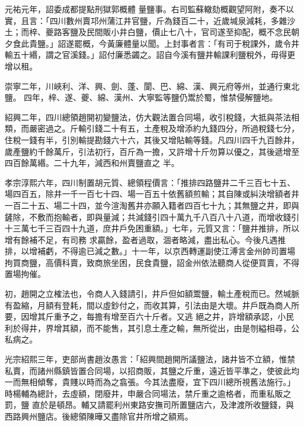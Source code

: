 \begin{pinyinscope}
 元祐元年，詔委成都提點刑獄郭概體
 量鹽事。右司監蘇轍劾概觀望阿附，奏不以實，且言：「四川數州賣邛州蒲江井官鹽，斤為錢百二十，近歲堿泉減耗，多雜沙土；而梓、夔路客鹽及民間販小井白鹽，價止七八十，官司遂至抑配，概不念民朝夕食此貴鹽。」詔遂罷概，今黃廉體量以聞。上封事者言：「有司于稅課外，歲令井輸五十緡，謂之官溪錢。」詔付廉悉蠲之。詔自今溪有鹽井輸課利鹽稅外，毋得更增以租。



 崇寧二年，川峽利、洋、興、劍、蓬、閬、巴、綿、漢、興元府等州，並通行東北鹽。
 四年，梓、遂、夔、綿、漢州、大寧監等鹽仍鬻於蜀，惟禁侵解鹽地。



 紹興二年，四川總領趙開初變鹽法，仿大觀法置合同場，收引稅錢，大抵與茶法相類，而嚴密過之。斤輸引錢二十有五，土產稅及增添約九錢四分，所過稅錢七分，住稅一錢有半，引別輸提勘錢六十六，其後又增貼輸等錢。凡四川四千九百餘井，歲產鹽約千餘萬斤，引法初行，百斤為一擔，又許增十斤勿算以優之，其後遞增至四百餘萬緡。二十九年，減西和州賣鹽直之
 半。



 孝宗淳熙六年，四川制置胡元質、總領程價言：「推排四路鹽井二千三百七十五、場四百五，除井一千一百七十四、場一百五十依舊額煎輸；其自陳或糾決增額者井一百二十五、場二十四，並今渲淘舊井亦願入籍者四百七十九；其無鹽之井，即與鏟除，不敷而抱輸者，即與量減；共減錢引四十萬九千八百八十八道，而增收錢引十三萬七千三百四十九道，庶井戶免困重額。」七年，元質又言：「鹽井推排，所以增有餘補不足，有司務
 求贏餘，盈者過取，涸者略減，盡出私心。今後凡遇推排，以增補虧，不得逾已減之數。」十一年，以京西轉運副使江溥言金州帥司置場拘買商鹽，高價科賣，致商旅坐困，民食貴鹽，詔金州依法聽商人從便買賣，不得置場拘催。



 初，趙開之立榷法也，令商人入錢請引，井戶但如額鬻鹽，輸土產稅而已。然堿脈有盈縮，月額有登耗，間以虛鈔付之，而收其算，引法由是大壞。井戶既為商人所要，因增其斤重予之，每擔有增至百六十斤者。又逃
 絕之井，許增額承認，小民利於得井，界增其額，而不能售，其引息土產之輸，無所從出，由是刎縊相尋，公私病之。



 光宗紹熙三年，吏部尚書趙汝愚言：「紹興間趙開所議鹽法，諸井皆不立額，惟禁私賣，而諸州縣鎮皆置合同場，以招商販，其鹽之斤重，遠近皆平準之，使彼此均一而無相傾奪，貴賤以時而為之翕張。今其法盡廢，宜下四川總所視舊法施行。」時楊輔為總計，去虛額，閉廢井，申嚴合同場法，禁斤重之逾格者，而重私販之罰，鹽
 直於是頓昂。輔又請罷利州東路安撫司所置鹽店六，及津渡所收鹽錢，與西路興州鹽店。後總領陳曄又盡除官井所增之額焉。




\end{pinyinscope}
